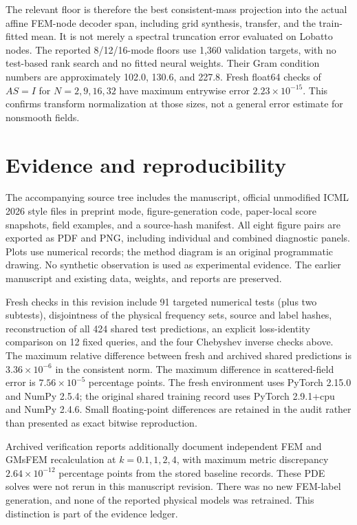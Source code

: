 \documentclass{article}
\begin{document}
The relevant floor is therefore the best consistent-mass projection into the actual affine FEM-node decoder span, including grid synthesis, transfer, and the train-fitted mean. It is not merely a spectral truncation error evaluated on Lobatto nodes. The reported 8/12/16-mode floors use 1,360 validation targets, with no test-based rank search and no fitted neural weights. Their Gram condition numbers are approximately 102.0, 130.6, and 227.8. Fresh float64 checks of $AS=I$ for $N=2,9,16,32$ have maximum entrywise error $2.23\times10^{-15}$. This confirms transform normalization at those sizes, not a general error estimate for nonsmooth fields.

\section{Evidence and reproducibility}\label{app:checks}
The accompanying source tree includes the manuscript, official unmodified ICML 2026 style files in preprint mode, figure-generation code, paper-local score snapshots, field examples, and a source-hash manifest. All eight figure pairs are exported as PDF and PNG, including individual and combined diagnostic panels. Plots use numerical records; the method diagram is an original programmatic drawing. No synthetic observation is used as experimental evidence. The earlier manuscript and existing data, weights, and reports are preserved.

Fresh checks in this revision include 91 targeted numerical tests (plus two subtests), disjointness of the physical frequency sets, source and label hashes, reconstruction of all 424 shared test predictions, an explicit loss-identity comparison on 12 fixed queries, and the four Chebyshev inverse checks above. The maximum relative difference between fresh and archived shared predictions is $3.36\times10^{-6}$ in the consistent norm. The maximum difference in scattered-field error is $7.56\times10^{-5}$ percentage points. The fresh environment uses PyTorch 2.15.0 and NumPy 2.5.4; the original shared training record uses PyTorch 2.9.1+cpu and NumPy 2.4.6. Small floating-point differences are retained in the audit rather than presented as exact bitwise reproduction.

Archived verification reports additionally document independent FEM and GMsFEM recalculation at $k=0.1,1,2,4$, with maximum metric discrepancy $2.64\times10^{-12}$ percentage points from the stored baseline records. These PDE solves were not rerun in this manuscript revision. There was no new FEM-label generation, and none of the reported physical models was retrained. This distinction is part of the evidence ledger.
\end{document}
